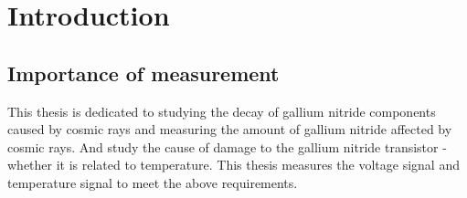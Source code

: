 

\chapter{Introduction}
\label{chap:Introduction}
 
\section{Importance of measurement}
\label{Importance of measurement}
This thesis is dedicated to studying the decay of gallium nitride components caused by cosmic rays and measuring the amount of gallium nitride affected by cosmic rays. And study the cause of damage to the gallium nitride transistor - whether it is related to temperature. This thesis measures the voltage signal and temperature signal to meet the above requirements.

